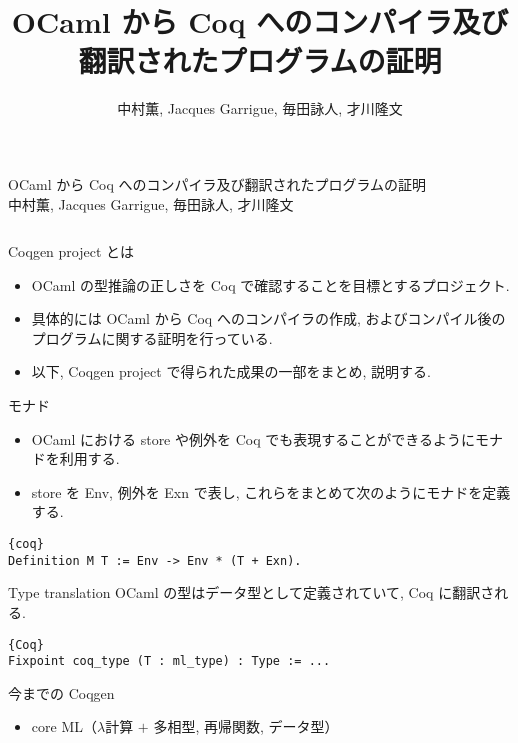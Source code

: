 \documentclass[unicode,mathserif]{beamer}
\title{OCaml から Coq へのコンパイラ及び翻訳されたプログラムの証明}
\author{中村薫, Jacques Garrigue, 毎田詠人, 才川隆文}
\begin{document}
\begin{frame}[fragile]
  \begin{screen}
    \begin{center}
      {\Huge OCaml から Coq へのコンパイラ及び翻訳されたプログラムの証明} \\
      {\Large 中村薫, Jacques Garrigue, 毎田詠人, 才川隆文}
    \end{center}
  \end{screen}

  \begin{columns}[T]
    \begin{column}{0.33\columnwidth}
      \begin{block}{Coqgen project とは}
        \begin{itemize}
          \item OCaml の型推論の正しさを Coq で確認することを目標とするプロジェクト. 
          \item 具体的には OCaml から Coq へのコンパイラの作成, およびコンパイル後のプログラムに関する証明を行っている. 
          \item 以下, Coqgen project で得られた成果の一部をまとめ, 説明する.
        \end{itemize} 
      \end{block}
      \begin{block}{モナド}
        \begin{itemize}
          \item OCaml における store や例外を Coq でも表現することができるようにモナドを利用する. 
          \item store を Env, 例外を Exn で表し, これらをまとめて次のようにモナドを定義する. 
        \end{itemize}
        \begin{lstlisting}{coq}
Definition M T := Env -> Env * (T + Exn).  \end{lstlisting}
      \end{block}
      \begin{block}{Type translation}
        OCaml の型はデータ型として定義されていて, Coq に翻訳される. 
        \begin{lstlisting}{Coq}
Fixpoint coq_type (T : ml_type) : Type := ...  \end{lstlisting}
      \end{block}
      \begin{block}{今までの Coqgen}
        \begin{itemize}
          \item core ML（$\lambda$計算 $+$ 多相型, 再帰関数, データ型）

\end{itemize}
\end{block}
\end{column}
\end{columns}
\end{frame}
\end{document}
